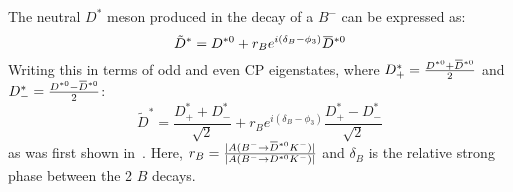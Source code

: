\documentclass[oneside,12pt]{article}
\newcommand{\overbar}[1]{\mkern 1.5mu\overline{\mkern-1.5mu#1\mkern-1.5mu}\mkern 1.5mu}
\begin{document}
\noindent The neutral ${D}^*$ meson produced in the decay of a $B^-$ can be expressed as:
  \begin{equation}
    \tilde{D}^*=D^{*0}+r_Be^{i(\delta_B-\phi_3)}\overbar{D}^{*0}
    \label{eq:DstTilde}
  \end{equation}
\noindent Writing this in terms of odd and even CP eigenstates, where $D^{*}_{+}=\frac{D^{*0}+\overbar{D}^{*0}}{2}$ and $D^{*}_{-}=\frac{D^{*0}-\overbar{D}^{*0}}{2}$:
  \begin{equation}
    \tilde{D}^*=\frac{D^{*}_{+}+D^{*}_{-}}{\sqrt{2}}+r_Be^{i(\delta_B-\phi_3)}\frac{D^{*}_{+}-D^{*}_{-}}{\sqrt{2}}
    \label{eq:DstTildeCP}
  \end{equation}
\noindent as was first shown in~\cite{ADSDstar}. Here, $r_B=\frac{|A(B^{-}\rightarrow \overbar{D}^{*0}K^-)|}{|A(B^{-}\rightarrow {D}^{*0}K^-)|}$ and $\delta_{B}$ is the relative strong phase between the 2 $B$ decays.
 
\end{document}
